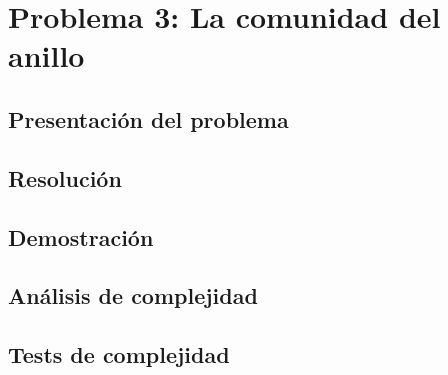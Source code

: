\section{Problema 3: La comunidad del anillo}

\subsection{Presentación del problema}

\subsection{Resolución}

\subsection{Demostración}

\subsection{Análisis de complejidad}

\subsection{Tests de complejidad}
